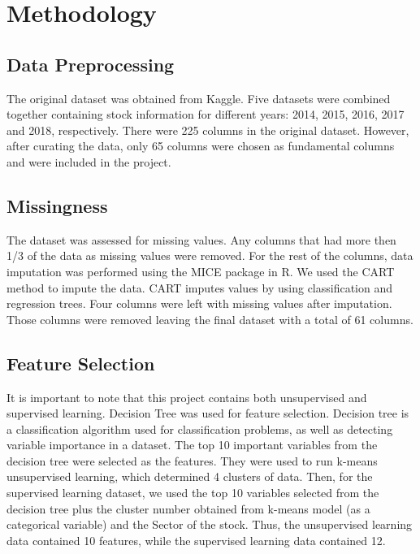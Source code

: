 \documentclass[11pt,]{article}
\begin{document}
\hypertarget{methodology}{%
\section{Methodology}\label{methodology}}

\hypertarget{data-preprocessing}{%
\subsection{Data Preprocessing}\label{data-preprocessing}}

The original dataset was obtained from Kaggle. Five datasets were
combined together containing stock information for different years:
2014, 2015, 2016, 2017 and 2018, respectively. There were 225 columns in
the original dataset. However, after curating the data, only 65 columns
were chosen as fundamental columns and were included in the project.

\hypertarget{missingness}{%
\subsection{Missingness}\label{missingness}}

The dataset was assessed for missing values. Any columns that had more
then 1/3 of the data as missing values were removed. For the rest of the
columns, data imputation was performed using the MICE package in R. We
used the CART method to impute the data. CART imputes values by using
classification and regression trees. Four columns were left with missing
values after imputation. Those columns were removed leaving the final
dataset with a total of 61 columns.

\hypertarget{feature-selection}{%
\subsection{Feature Selection}\label{feature-selection}}

It is important to note that this project contains both unsupervised and
supervised learning. Decision Tree was used for feature selection.
Decision tree is a classification algorithm used for classification
problems, as well as detecting variable importance in a dataset. The top
10 important variables from the decision tree were selected as the
features. They were used to run k-means unsupervised learning, which
determined 4 clusters of data. Then, for the supervised learning
dataset, we used the top 10 variables selected from the decision tree
plus the cluster number obtained from k-means model (as a categorical
variable) and the Sector of the stock. Thus, the unsupervised learning
data contained 10 features, while the supervised learning data contained
12.
\end{document}
